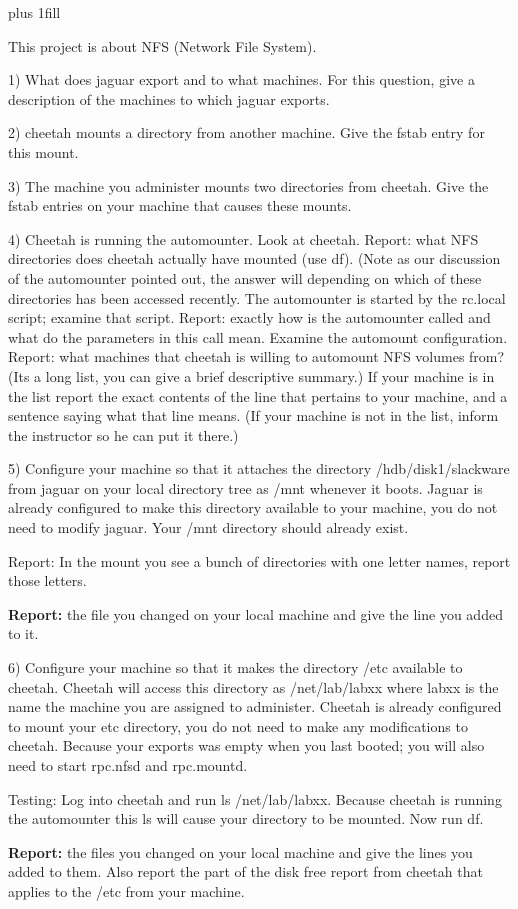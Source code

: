 
\rightskip=0pt plus 1fill

\parindent 0pt

This project is about NFS (Network File System).

1) What does jaguar export and to what machines.
For this question, give a description of the machines to which
jaguar exports.

2) cheetah mounts a directory from another machine.
Give the fstab entry for this mount.

3) The machine you administer mounts two directories from cheetah.
Give the fstab entries on your machine that causes these mounts.

4) Cheetah is running the automounter.
Look at cheetah. 
Report: what NFS directories does cheetah actually have mounted 
(use {\ltt{}df}).
(Note as our discussion of the automounter pointed out, the answer will
depending on which of these directories has been accessed recently.
The automounter is started by the {\ltt{}rc.local} script;
examine that script.
Report: exactly how is the automounter called and
what do the parameters in this call mean.
Examine the automount configuration.
Report: what machines that cheetah is willing to automount NFS volumes from?
(Its a long list, you can give a brief descriptive summary.)
If your machine is in the list report the exact contents of the
line that pertains to your machine, and a sentence saying what that
line means.
(If your machine is not in the list, inform the instructor so he can put it
there.)

5) Configure your machine so that it attaches the directory
{\ltt{}/hdb/disk1/slackware} from jaguar on your local directory tree
as {\ltt{}/mnt} whenever it boots.
Jaguar is already configured to make this directory available to your
machine, you do not need to modify jaguar.
Your {\ltt{}/mnt} directory should already exist.

Report: In the mount you see a bunch of directories with one letter names,
report those letters.

{\bf Report:} the file you changed on your local machine and give the line
you added to it.

6) Configure your machine so that it makes the directory
{\ltt{}/etc} available to cheetah.
Cheetah will access this directory as {\ltt{}/net/lab/labxx} where {\ltt{}labxx}
is the name the machine you are assigned to administer.
Cheetah is already configured to mount your {\ltt{}etc} directory,
you do not need to make any modifications to cheetah.
Because your {\ltt{}exports} was empty when you last booted;
you will also need to start {\ltt{}rpc.nfsd} and {\ltt{}rpc.mountd}.

Testing: Log into cheetah and run {\ltt{}ls /net/lab/labxx}.
Because cheetah is running the automounter
this {\ltt{}ls} will cause your directory to be mounted.
Now run {\ltt{}df}.

{\bf Report:} the files you changed on your local machine and give the lines 
you added to them.
Also report the part of the disk free report from cheetah that applies to 
the {\ltt{}/etc} from your machine.

\bye
